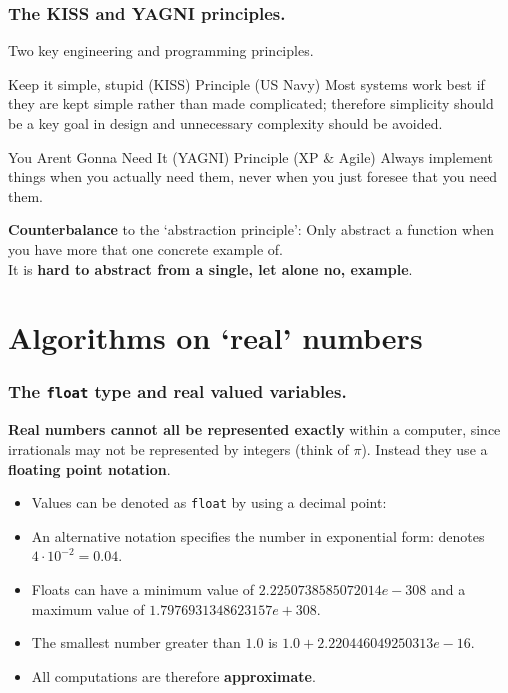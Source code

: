 \documentclass{beamer} %
\newcommand\emc[1]{\textcolor{brightblue}{\textbf{#1}}}
\begin{document}
\begin{frame}
\frametitle{The KISS and YAGNI principles.}

Two key engineering and programming principles.

\begin{block}{Keep it simple, stupid (KISS) Principle (US Navy)}
Most systems work best if they are kept simple rather than made complicated; therefore simplicity should be a key goal in design and unnecessary complexity should be avoided.
\end{block}

\begin{block}{You Arent Gonna Need It (YAGNI) Principle (XP \& Agile)}
Always implement things when you actually need them, never when you just foresee that you need them.
\end{block}

\emc{Counterbalance} to the `abstraction principle': Only abstract a function when you have more that one concrete example of.\\ It is \emc{hard to abstract from a single, let alone no, example}.

\end{frame}

\section{Algorithms on `real' numbers}

\begin{frame}
\frametitle{The \texttt{float} type and real valued variables.}

\emc{Real numbers cannot all be represented exactly} within a computer, since irrationals may not be represented by integers (think of $\pi$). Instead they use a \emc{floating point notation}.


\begin{itemize}
	\item Values can be denoted as \texttt{float} by using a decimal point:
	\item An alternative notation specifies the number in exponential form:
	denotes $4 \cdot 10^{-2} = 0.04$.
	\item Floats can have a minimum value of $2.2250738585072014e-308$ and a maximum value of $1.7976931348623157e+308$.
	\item The smallest number greater than $1.0$ is $1.0 + 2.220446049250313e-16$.
	\item All computations are therefore \emc{approximate}.
\end{itemize}

\end{frame}
\end{document}
